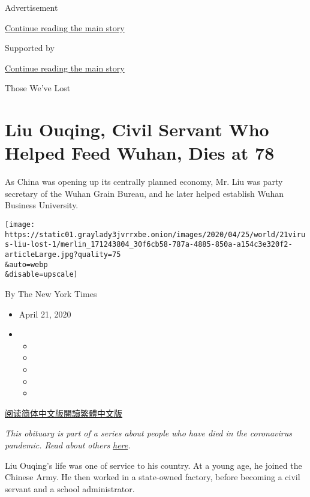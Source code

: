 Advertisement

\protect\hyperlink{after-top}{Continue reading the main story}

Supported by

\protect\hyperlink{after-sponsor}{Continue reading the main story}

Those We've Lost

\hypertarget{liu-ouqing-civil-servant-who-helped-feed-wuhan-dies-at-78}{%
\section{Liu Ouqing, Civil Servant Who Helped Feed Wuhan, Dies at
78}\label{liu-ouqing-civil-servant-who-helped-feed-wuhan-dies-at-78}}

As China was opening up its centrally planned economy, Mr. Liu was party
secretary of the Wuhan Grain Bureau, and he later helped establish Wuhan
Business University.

\texttt{[image: https://static01.graylady3jvrrxbe.onion/images/2020/04/25/world/21virus-liu-lost-1/merlin\_171243804\_30f6cb58-787a-4885-850a-a154c3e320f2-articleLarge.jpg?quality=75\\\&auto=webp\\\&disable=upscale]}

By The New York Times

\begin{itemize}
\item
  April 21, 2020
\item
  \begin{itemize}
  \item
  \item
  \item
  \item
  \item
  \end{itemize}
\end{itemize}

\href{https://cn.nytimes3xbfgragh.onion/obits/20200423/ouqing-liu-coronavirus-dead/}{阅读简体中文版}\href{https://cn.nytimes3xbfgragh.onion/obits/20200423/ouqing-liu-coronavirus-dead/zh-hant/}{閱讀繁體中文版}

\emph{This obituary is part of a series about people who have died in
the coronavirus pandemic. Read about others}
\href{https://www.nytimes3xbfgragh.onion/series/people-who-have-died-of-the-coronavirus}{\emph{here}}\emph{.}

Liu Ouqing's life was one of service to his country. At a young age, he
joined the Chinese Army. He then worked in a state-owned factory, before
becoming a civil servant and a school administrator.

